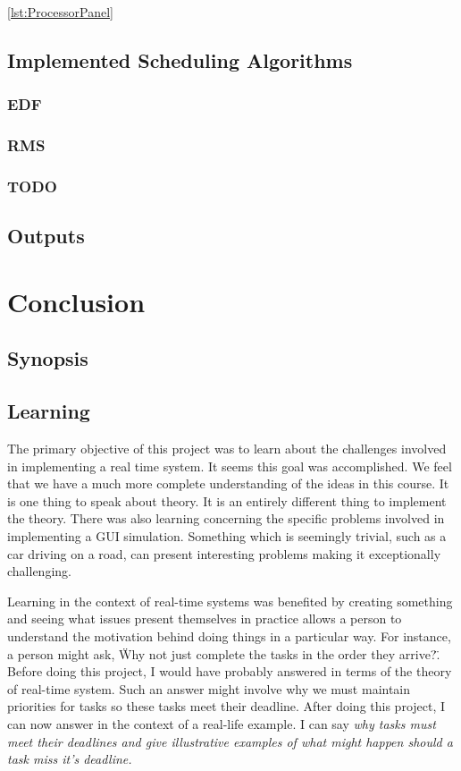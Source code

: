 \documentclass{article} %
\begin{document}
\ref{lst:ProcessorPanel}

\subsection{Implemented Scheduling Algorithms}
\subsubsection{EDF}

\subsubsection{RMS}

\subsubsection{TODO}

\subsection{Outputs}

\section{Conclusion}
\subsection{Synopsis}

\subsection{Learning}
The primary objective of this project was to learn about the challenges involved in implementing a real time system.
It seems this goal was accomplished. We feel that we have a much more complete understanding of the ideas in this course.
It is one thing to speak about theory. It is an entirely different thing to implement the theory.
There was also learning concerning the specific problems involved in implementing a GUI simulation.
Something which is seemingly trivial, such as a car driving on a road, can present interesting problems making it exceptionally challenging.

Learning in the context of real-time systems was benefited by
creating something and seeing what issues present themselves in practice allows a person to understand the motivation behind doing things in a particular way.
For instance, a person might ask, \"Why not just complete the tasks in the order they arrive?\". Before doing this project, I would have probably answered in terms of the theory of real-time system.
Such an answer might involve why we must maintain priorities for tasks so these tasks meet their deadline.
After doing this project, I can now answer in the context of a real-life example. I can say
\it why \normalfont
tasks must meet their deadlines and give illustrative examples of what might happen should a task miss it's deadline.
\end{document}
